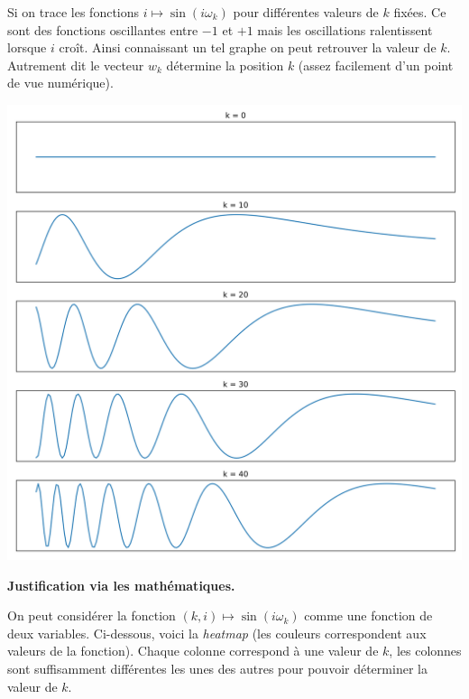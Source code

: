 \documentclass[11pt,class=report,crop=false]{standalone}
\begin{document}
Si on trace les fonctions $i \mapsto \sin( i \omega_k)$ pour différentes valeurs de $k$ fixées. Ce sont des fonctions oscillantes entre $-1$ et $+1$ mais les oscillations ralentissent lorsque $i$ croît. Ainsi connaissant un tel graphe on peut retrouver la valeur de $k$. Autrement dit le vecteur $w_k$ détermine  la position $k$ (assez facilement d'un point de vue numérique).

\begin{center}
	\includegraphics[scale=\myscale,scale=0.4]{figures/position-kcst}
\end{center}

\bigskip

\textbf{Justification via les mathématiques.}

On peut considérer la fonction $(k,i) \mapsto \sin( i \omega_k)$ comme une fonction de deux variables. Ci-dessous, voici la \emph{heatmap} (les couleurs correspondent aux valeurs de la fonction). Chaque colonne correspond à une valeur de $k$, les colonnes sont suffisamment différentes les unes des autres pour pouvoir déterminer la valeur de $k$.
\end{document}
